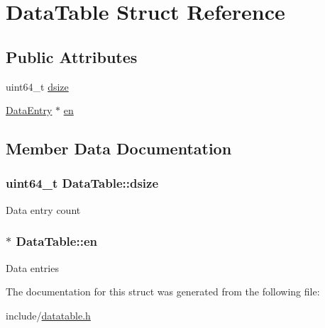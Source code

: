 \hypertarget{structDataTable}{\section{\-Data\-Table \-Struct \-Reference}
\label{structDataTable}
}
\subsection*{\-Public \-Attributes}
\begin{DoxyCompactItemize}
\item 
uint64\-\_\-t \hyperlink{structDataTable_aa3e7429f196ae5cd59a105ac4cc8b4f1}{dsize}
\item 
\hyperlink{structDataEntry}{\-Data\-Entry} $\ast$ \hyperlink{structDataTable_af6fc243040c51833a8c3ea104606317d}{en}
\end{DoxyCompactItemize}


\subsection{\-Member \-Data \-Documentation}
\hypertarget{structDataTable_aa3e7429f196ae5cd59a105ac4cc8b4f1}{
\subsubsection[{dsize}]{\setlength{\rightskip}{0pt plus 5cm}uint64\-\_\-t {\bf \-Data\-Table\-::dsize}}}\label{structDataTable_aa3e7429f196ae5cd59a105ac4cc8b4f1}
\-Data entry count \hypertarget{structDataTable_af6fc243040c51833a8c3ea104606317d}{
\subsubsection[{en}]{$\ast$ {\bf \-Data\-Table\-::en}}}\label{structDataTable_af6fc243040c51833a8c3ea104606317d}
\-Data entries 

\-The documentation for this struct was generated from the following file\-:\begin{DoxyCompactItemize}
\item 
include/\hyperlink{datatable_8h}{datatable.\-h}\end{DoxyCompactItemize}
